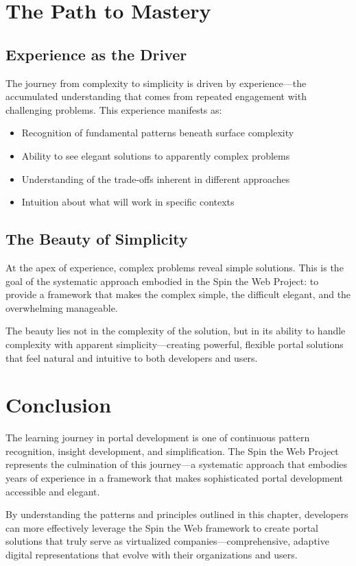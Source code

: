\section{The Path to Mastery}

\subsection{Experience as the Driver}

The journey from complexity to simplicity is driven by experience—the accumulated understanding that comes from repeated engagement with challenging problems. This experience manifests as:

\begin{itemize}
\item Recognition of fundamental patterns beneath surface complexity
\item Ability to see elegant solutions to apparently complex problems
\item Understanding of the trade-offs inherent in different approaches
\item Intuition about what will work in specific contexts
\end{itemize}

\subsection{The Beauty of Simplicity}

At the apex of experience, complex problems reveal simple solutions. This is the goal of the systematic approach embodied in the Spin the Web Project: to provide a framework that makes the complex simple, the difficult elegant, and the overwhelming manageable.

The beauty lies not in the complexity of the solution, but in its ability to handle complexity with apparent simplicity—creating powerful, flexible portal solutions that feel natural and intuitive to both developers and users.

\section{Conclusion}

The learning journey in portal development is one of continuous pattern recognition, insight development, and simplification. The Spin the Web Project represents the culmination of this journey—a systematic approach that embodies years of experience in a framework that makes sophisticated portal development accessible and elegant.

By understanding the patterns and principles outlined in this chapter, developers can more effectively leverage the Spin the Web framework to create portal solutions that truly serve as virtualized companies—comprehensive, adaptive digital representations that evolve with their organizations and users.
